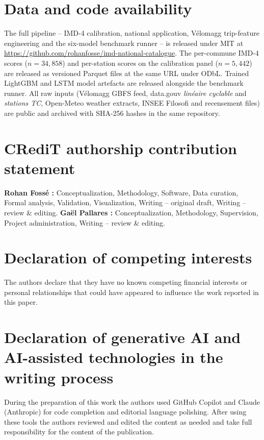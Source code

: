 \documentclass[11pt,a4paper]{article}
\begin{document}
\section*{Data and code availability}

The full pipeline -- IMD-4 calibration, national application,
V\'elomagg trip-feature engineering and the six-model benchmark
runner -- is released under MIT at
\url{https://github.com/rohanfosse/imd-national-catalogue}.  The
per-commune IMD-4 scores ($n = 34{,}858$) and per-station scores
on the calibration panel ($n = 5{,}442$) are released as
versioned Parquet files at the same URL under ODbL.  Trained
LightGBM and LSTM model artefacts are released alongside the
benchmark runner.  All raw inputs (V\'elomagg GBFS feed,
data.gouv \emph{lin\'eaire cyclable} and \emph{stations TC},
Open-Meteo weather extracts, INSEE Filosofi and recensement
files) are public and archived with SHA-256 hashes in the same
repository.

\section*{CRediT authorship contribution statement}
\textbf{Rohan Foss\'e :} Conceptualization, Methodology,
Software, Data curation, Formal analysis, Validation,
Visualization, Writing -- original draft, Writing -- review \&
editing.
\textbf{Ga\"el Pallares :} Conceptualization, Methodology,
Supervision, Project administration, Writing -- review \&
editing.

\section*{Declaration of competing interests}
The authors declare that they have no known competing financial
interests or personal relationships that could have appeared to
influence the work reported in this paper.

\section*{Declaration of generative AI and AI-assisted technologies in the writing process}
During the preparation of this work the authors used GitHub
Copilot and Claude (Anthropic) for code completion and editorial
language polishing.  After using these tools the authors reviewed
and edited the content as needed and take full responsibility
for the content of the publication.
\end{document}
